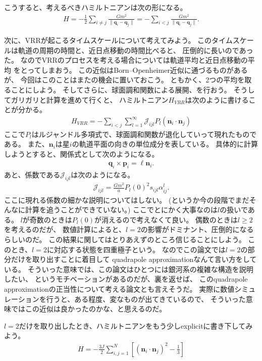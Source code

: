 \documentclass[10pt, pre, twocolumn, showpacs, aps]{revtex4-1}
\begin{document}
こうすると、考えるべきハミルトニアンは次の形になる。
\begin{align}
H=-\frac{1}{2}\sum_{i\ne j}\frac{Gm^{2}}{\|\pmb{q}_{i}-\pmb{q}_{j}\|}
=-\sum_{i<j}\frac{Gm^{2}}{\|\pmb{q}_{i}-\pmb{q}_{j}\|}.
\end{align}

次に、VRRが起こるタイムスケールについて考えてみよう。
このタイムスケールは軌道の周期の時間と、近日点移動の時間比べると、
圧倒的に長いのであった。
なのでVRRのプロセスを考える場合については軌道平均と近日点移動の平均
をとってしまおう。
この近似はBorn--Openheimer近似に通づるものがあるが、
今回はこのことはまたの機会に置いておこう。
ともかく、2つの平均を取ることにしよう。
そしてさらに、球面調和関数による展開、を行おう。
そうしてガリガリと計算を進めて行くと、
ハミルトニアン$H_{VRR}$は次のように書けることが分かる。
\begin{align}
H_{VRR}=-\sum_{i<j}\sum_{l=1}^{\infty}\mathcal{J}_{ijl}P_{l}(\pmb{n}_{i}\cdot\pmb{n}_{j})
\end{align}
ここで$P_{l}$はルジャンドル多項式で、球面調和関数が退化していって現れたものである。
また、$\pmb{n}_{i}$は星$i$の軌道平面の向きの単位成分を表している。
具体的に計算しようとすると、関係式として次のようになる。
\begin{align}
\pmb{q}_{i}\times\pmb{p}_{i}=\ell\pmb{n}_{i}.
\end{align}
あと、係数である$\mathcal{J}_{ijl}$は次のようになる。
\begin{align}
\mathcal{J}_{ijl}=\frac{Gm^{2}}{a}P_{l}(0)^{2}s_{ijl}\alpha_{ij}^{l}.
\end{align}
ここに現れる係数の細かな説明についてはしない。
(というか今の段階でまだそんなに計算を追うことができていない。)
ここでとにかく大事なのは$l$の扱いである。
$l$が奇数のときは$P_{l}(0)$が消えるので考えなくて良い。
偶数のときは$l\geq 2$を考えるのだが、
数値計算によると、$l=2$の影響がドミナント、圧倒的になるらしいのだ。
この結果に関してはとりあえずのところ信じることにしよう。
このとき、$l=2$に対応する状態を四重極子という。
なのでこの論文では$l=2$の部分だけを取り出すことに着目して
quadrapole approximationなんて言い方をしている。
そういった意味では、この論文はひとつには銀河系の複雑な構造を説明したい、
というモチベーションがあるのだが、裏を返せば、
このquadrapole approximationの正当性について考える論文とも言えそうだ。
実際に数値シミュレーションを行うと、ある程度、変なものが出てきているので、
そういった意味ではこの近似は良かったのかな、と思えるのだ。

$l=2$だけを取り出したとき、ハミルトニアンをもう少しexplicitに書き下してみよう。
\begin{align}
H=-\frac{3J}{2}\sum_{i,j=1}^{N}\left[(\pmb{n}_{i}\cdot\pmb{n}_{j})^{2}-\frac{1}{3}\right]
\end{align}
\end{document}
